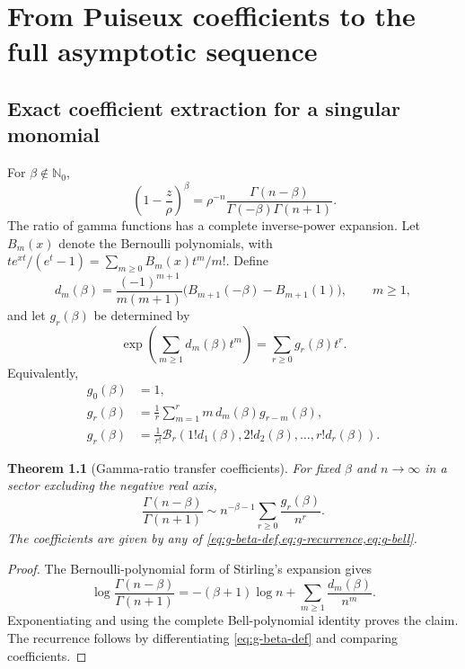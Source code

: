 \documentclass[11pt,a4paper,oneside,openany]{book}
\newtheorem{theorem}{Theorem}[chapter]
\theoremstyle{definition}
\theoremstyle{remark}
\newcommand{\N}{\mathbb N}
\newcommand{\Coeff}[3]{[ #1^{#2}]\,#3}
\newcommand{\Bell}[1]{\mathcal B_{#1}}
\begin{document}
\chapter{From Puiseux coefficients to the full asymptotic sequence}
\label{ch:transfer}

\section{Exact coefficient extraction for a singular monomial}
For $\beta\notin\N_0$,
\begin{equation}
 \Coeff zn{\left(1-\frac z\rho\right)^\beta}
 =\rho^{-n}\frac{\Gamma(n-\beta)}{\Gamma(-\beta)\Gamma(n+1)}.
 \label{eq:exact-binomial-transfer}
\end{equation}
The ratio of gamma functions has a complete inverse-power expansion.  Let
$B_m(x)$ denote the Bernoulli polynomials, with
$te^{xt}/(e^t-1)=\sum_{m\ge0}B_m(x)t^m/m!$.  Define
\begin{equation}
 d_m(\beta)=
 \frac{(-1)^{m+1}}{m(m+1)}
 \bigl(B_{m+1}(-\beta)-B_{m+1}(1)\bigr),
 \qquad m\ge1,
 \label{eq:d-beta}
\end{equation}
and let $g_r(\beta)$ be determined by
\begin{equation}
 \exp\!\left(\sum_{m\ge1}d_m(\beta)t^m\right)
 =\sum_{r\ge0}g_r(\beta)t^r.
 \label{eq:g-beta-def}
\end{equation}
Equivalently,
\begin{align}
 g_0(\beta)&=1,\label{eq:g0}\\
 g_r(\beta)&=\frac1r\sum_{m=1}^r m\,d_m(\beta)g_{r-m}(\beta),
 \label{eq:g-recurrence}\\
 g_r(\beta)&=\frac1{r!}\Bell r(1!d_1(\beta),2!d_2(\beta),\ldots,r!d_r(\beta)).
 \label{eq:g-bell}
\end{align}

\begin{theorem}[Gamma-ratio transfer coefficients]
\label{thm:gamma-ratio}
For fixed $\beta$ and $n\to\infty$ in a sector excluding the negative real axis,
\begin{equation}
 \frac{\Gamma(n-\beta)}{\Gamma(n+1)}
 \sim n^{-\beta-1}\sum_{r\ge0}\frac{g_r(\beta)}{n^r}.
 \label{eq:gamma-ratio-expansion}
\end{equation}
The coefficients are given by any of
\cref{eq:g-beta-def,eq:g-recurrence,eq:g-bell}.
\end{theorem}

\begin{proof}
The Bernoulli-polynomial form of Stirling's expansion gives
\[
 \log\frac{\Gamma(n-\beta)}{\Gamma(n+1)}
 =-(\beta+1)\log n+
 \sum_{m\ge1}\frac{d_m(\beta)}{n^m}.
\]
Exponentiating and using the complete Bell-polynomial identity proves the
claim.  The recurrence follows by differentiating
\cref{eq:g-beta-def} and comparing coefficients.
\end{proof}
\end{document}
